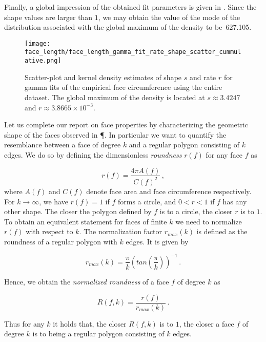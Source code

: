 		Finally, a global impression of the obtained fit parameters is given in . Since the shape values are larger than $1$, we may obtain the value of the mode of the distribution associated with the global maximum of the density to be~\SI{627.105}{\pixel}.

		\begin{figure}[!htbp]
			\centering
				\texttt{[image: face\_length/face\_length\_gamma\_fit\_rate\_shape\_scatter\_cummulative.png]}
			\caption[Face circumference distribution - Fit parameter densities]{Scatter-plot and kernel density estimates of shape $s$ and rate $r$ for gamma fits of the empirical face circumference using the entire dataset. The global maximum of the density is located at $s \approx 3.4247$ and $r \approx 3.8665 \times 10^{-3}$.}
			\label{fig:face_length_kde}
		\end{figure}

		Let us complete our report on face properties by characterizing the geometric shape of the faces observed in \P. In particular we want to quantify the resemblance between a face of degree $k$ and a regular polygon consisting of $k$ edges. We do so by defining the dimensionless \emph{roundness} $r(f)$ for any face $f$ as

		\begin{equation}
			 r(f) = \frac{4 \pi A(f)}{C(f)^2}\,,
		\end{equation}
		where $A(f)$ and $C(f)$ denote face area and face circumference respectively. For $k \to \infty$, we have $r(f) = 1$ if $f$ forms a circle, and $0 < r < 1$ if $f$ has any other shape. The closer the polygon defined by $f$ is to a circle, the closer $r$ is to $1$. To obtain an equivalent statement for faces of finite $k$ we need to normalize $r(f)$ with respect to $k$. The normalization factor $r_{max}(k)$ is defined as the roundness of a regular polygon with $k$ edges. It is given by

		\begin{equation}
			r_{max}(k) = \frac{\pi}{k} (tan(\frac{\pi}{k}))^{-1}\,.
		\end{equation}

		Hence, we obtain the \emph{normalized roundness} of a face $f$ of degree $k$ as

		\begin{equation}
			R(f,k) = \frac{r(f)}{r_{max}(k)}\,.
		\end{equation}

		Thus for any $k$ it holds that, the closer $R(f,k)$ is to $1$, the closer a face $f$ of degree $k$ is to being a regular polygon consisting of $k$ edges. 

